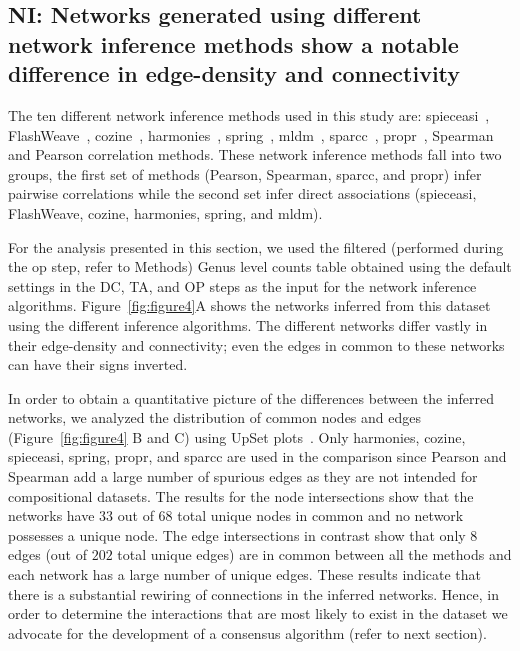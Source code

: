   \FloatBarrier

  \subsection*{NI: Networks generated using different network inference methods show a notable difference in edge-density and connectivity}

  The ten different network inference methods used in this study are: \acs{spieceasi}~\cite{Kurtz2015}, FlashWeave~\cite{tackmannRapidInferenceDirect2019}, \acs{cozine}~\cite{haCompositionalZeroinflatedNetwork2020a}, \acs{harmonies}~\cite{jiangHARMONIESHybridApproach2020}, \acs{spring}~\cite{yoonMicrobialNetworksSPRING2019}, \acs{mldm}~\cite{Yang2017}, \acs{sparcc}~\cite{Friedman2012,Watts2018}, propr~\cite{quinnProprRpackageIdentifying2017}, Spearman and Pearson correlation methods.
  These network inference methods fall into two groups, the first set of methods (Pearson, Spearman, \acs{sparcc}, and propr) infer pairwise correlations while the second set infer direct associations (\acs{spieceasi}, FlashWeave, \acs{cozine}, \acs{harmonies}, \acs{spring}, and \acs{mldm}).

  For the analysis presented in this section, we used the filtered (performed during the \ac{op} step, refer to Methods) Genus level counts table obtained using the default settings in the DC, TA, and OP steps as the input for the network inference algorithms.
  Figure~\ref{fig:figure4}A shows the networks inferred from this dataset using the different inference algorithms.
  The different networks differ vastly in their edge-density and connectivity; even the edges in common to these networks can have their signs inverted.

  In order to obtain a quantitative picture of the differences between the inferred networks, we analyzed the distribution of common nodes and edges (Figure~\ref{fig:figure4} B and C) using UpSet plots~\cite{Lex}.
  Only \acs{harmonies}, \acs{cozine}, \acs{spieceasi}, \acs{spring}, propr, and \acs{sparcc} are used in the comparison since Pearson and Spearman add a large number of spurious edges as they are not intended for compositional datasets.
  The results for the node intersections show that the networks have $33$ out of $68$ total unique nodes in common and no network possesses a unique node.
  The edge intersections in contrast show that only $8$ edges (out of $202$ total unique edges) are in common between all the methods and each network has a large number of unique edges.
  These results indicate that there is a substantial rewiring of connections in the inferred networks.
  Hence, in order to determine the interactions that are most likely to exist in the dataset we advocate for the development of a consensus algorithm (refer to next section).

